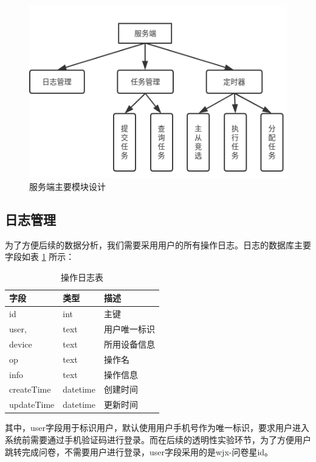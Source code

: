 \begin{figure}[ht]
    \centering
    \includegraphics[width=12cm]{images/server.png}
    \caption{服务端主要模块设计}
    \label{fig:server}
\end{figure}


\subsection{日志管理}
为了方便后续的数据分析，我们需要采用用户的所有操作日志。日志的数据库主要字段如表 \ref{tab:op_log} 所示：

\begin{table}[]
    \centering
    \begin{tabular}{lll}
        \toprule
        字段 & 类型 & 描述 \\ 
        \midrule
        id & int & 主键 \\
        user, & text & 用户唯一标识 \\ 
        device & text & 所用设备信息 \\
        op & text & 操作名 \\
        info & text & 操作信息 \\
        createTime & datetime & 创建时间 \\
        updateTime & datetime & 更新时间\\
        \bottomrule
    \end{tabular}
    \caption{操作日志表}
    \label{tab:op_log}
\end{table}


其中，user字段用于标识用户，默认使用用户手机号作为唯一标识，要求用户进入系统前需要通过手机验证码进行登录。而在后续的透明性实验环节，为了方便用户跳转完成问卷，不需要用户进行登录，user字段采用的是wjx-问卷星id。

